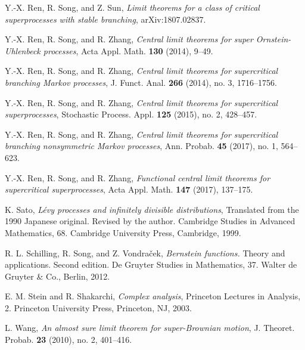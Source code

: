 \documentclass[12pt,a4paper]{amsart}
\theoremstyle{plain}
\theoremstyle{definition}
\numberwithin{equation}{section}
\begin{document}
\begin{thebibliography}{10}
  Y.-X. Ren, R. Song, and Z. Sun, 
  \emph{Limit theorems for a class of critical superprocesses with stable branching},
  arXiv:1807.02837.

  Y.-X. Ren, R. Song, and R. Zhang, 
  \emph{Central limit theorems for super {O}rnstein-{U}hlenbeck processes}, 
  Acta Appl. Math. \textbf{130} (2014), 9--49.

  Y.-X. Ren, R. Song, and R. Zhang, 
  \emph{Central limit theorems for supercritical branching {M}arkov processes}, 
  J. Funct. Anal. \textbf{266} (2014), no. 3, 1716--1756.

  Y.-X. Ren, R. Song, and R. Zhang, 
  \emph{Central limit theorems for supercritical superprocesses},
  Stochastic Process. Appl. \textbf{125} (2015), no. 2, 428--457.

  Y.-X. Ren, R. Song, and R. Zhang, 
  \emph{Central limit theorems for supercritical branching nonsymmetric {M}arkov processes}, 
  Ann. Probab. \textbf{45} (2017), no. 1, 564--623.

  Y.-X. Ren, R. Song, and R. Zhang, 
  \emph{Functional central limit theorems for supercritical superprocesses}, 
  Acta Appl. Math. \textbf{147} (2017), 137--175.

  K. Sato, 
  \emph{L{\'e}vy processes and infinitely divisible distributions},
  Translated from the 1990 Japanese original. Revised by the author. Cambridge Studies in Advanced Mathematics, 68. Cambridge University Press, Cambridge, 1999.

  R. L. Schilling, R. Song, and Z. Vondra\v{c}ek,
  \emph{Bernstein functions.}
  Theory and applications. Second edition. De Gruyter Studies in Mathematics, 37. Walter de Gruyter \& Co., Berlin, 2012.

  E. M. Stein and R. Shakarchi, \emph{Complex analysis}, 
  Princeton Lectures in Analysis, 2. Princeton University Press, Princeton, NJ, 2003.

  L. Wang, \emph{An almost sure limit theorem for super-{B}rownian motion}, 
  J. Theoret. Probab. \textbf{23} (2010), no. 2, 401--416.

\end{thebibliography}
\end{document}
